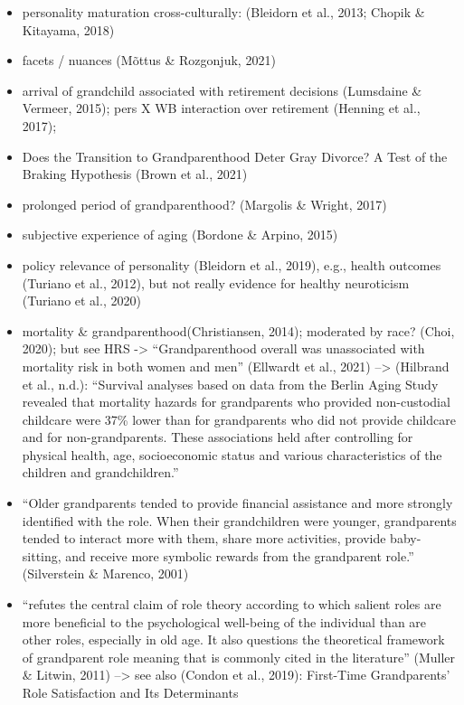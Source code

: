 \documentclass[
  english,
  man, noextraspace]{apa7}
\begin{document}
\begin{itemize}
\item
  personality maturation cross-culturally: (Bleidorn et al., 2013; Chopik \& Kitayama, 2018)
\item
  facets / nuances (Mõttus \& Rozgonjuk, 2021)
\item
  arrival of grandchild associated with retirement decisions (Lumsdaine \& Vermeer, 2015); pers X WB interaction over retirement (Henning et al., 2017);
\item
  Does the Transition to Grandparenthood Deter Gray Divorce? A Test of the Braking Hypothesis (Brown et al., 2021)
\item
  prolonged period of grandparenthood? (Margolis \& Wright, 2017)
\item
  subjective experience of aging (Bordone \& Arpino, 2015)
\item
  policy relevance of personality (Bleidorn et al., 2019), e.g., health outcomes (Turiano et al., 2012), but not really evidence for healthy neuroticism (Turiano et al., 2020)
\item
  mortality \& grandparenthood(Christiansen, 2014); moderated by race? (Choi, 2020); but see HRS -\textgreater{} \enquote{Grandparenthood overall was unassociated with mortality risk in both women and men} (Ellwardt et al., 2021)
  --\textgreater{} (Hilbrand et al., n.d.): \enquote{Survival analyses based on data from the Berlin Aging Study revealed that mortality hazards for grandparents who provided non-custodial childcare were 37\% lower than for grandparents who did not provide childcare and for non-grandparents. These associations held after controlling for physical health, age, socioeconomic status and various characteristics of the children and grandchildren.}
\item
  \enquote{Older grandparents tended to provide financial assistance and more strongly identified with the role. When their grandchildren were younger, grandparents tended to interact more with them, share more activities, provide baby-sitting, and receive more symbolic rewards from the grandparent role.} (Silverstein \& Marenco, 2001)
\item
  \enquote{refutes the central claim of role theory according to which salient roles are more beneficial to the psychological well-being of the individual than are other roles, especially in old age. It also questions the theoretical framework of grandparent role meaning that is commonly cited in the literature} (Muller \& Litwin, 2011)
  --\textgreater{} see also (Condon et al., 2019): First-Time Grandparents' Role Satisfaction and Its Determinants

\end{itemize}
\end{document}
